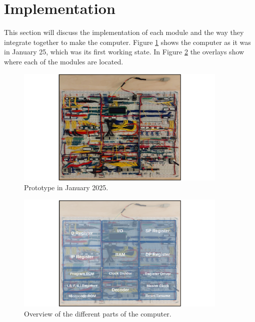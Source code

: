 \section{Implementation}
This section will discuss the implementation of each module and the way they integrate together to make the computer. Figure \ref{fig:computer} shows the computer as it was in January 25, which was its first working state. In Figure \ref{fig:computer_parts} the overlays show where each of the modules are located.

\begin{figure}[H]
  \centering
  \includegraphics[width=0.9\textwidth]{img/computer}
  \caption{Prototype in January 2025.}
  \label{fig:computer}
\end{figure}

\begin{figure}[H]
  \centering
  \includegraphics[width=0.9\textwidth]{img/computer_parts}
  \caption{Overview of the different parts of the computer.}
  \label{fig:computer_parts}
\end{figure}

